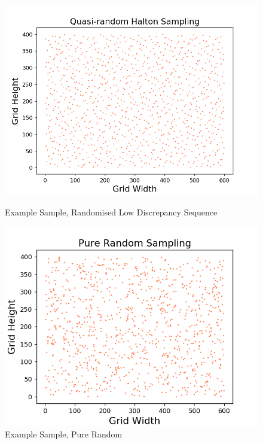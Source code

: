 \documentclass{article}
\begin{document}
    \begin{figure}[!tbp]
        \centering
        \begin{minipage}[b]{0.45\textwidth}
            \includegraphics[width=\textwidth]{pictures/part_4/halton.png}
            \caption{Example Sample, Randomised Low Discrepancy Sequence}
            \label{fig:halton_sample}
        \end{minipage}
        \hfill
        \begin{minipage}[b]{0.45\textwidth}
            \includegraphics[width=\textwidth]{pictures/part_4/pure_rand.png}
            \caption{Example Sample, Pure Random}
            \label{fig:pure_random_sample}
        \end{minipage}
    \end{figure}
\end{document}
